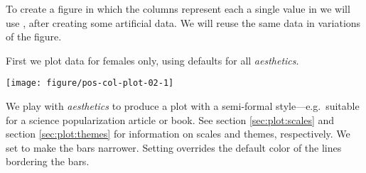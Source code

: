 \documentclass[krantz2]{krantz}\usepackage{knitr}%
\begin{document}
To create a figure in which the columns represent each a single value in  we will use , after creating some artificial data. We will reuse the same data in variations of the figure.

\begin{knitrout}\footnotesize
{}\color{fgcolor}\begin{kframe}
\begin{alltt}
\hlstd{(}\hlstd{)}
 \hlkwb{<-} \hlstd{(} \hlstd{=} \hlstd{(}\hlstd{(}\hlstd{(}\hlstd{,} \hlstd{,} \hlstd{),} \hlstd{)),}
                           \hlstd{=} \hlstd{(}\hlstd{(}\hlstd{(}\hlstd{,} \hlstd{),} \hlstd{(}\hlstd{,} \hlstd{))),}
                           \hlstd{=} \hlstd{(}\hlstd{)} \hlopt{+} \hlstd{(}\hlstd{,} \hlstd{,} \hlstd{))}
\end{alltt}
\end{kframe}
\end{knitrout}

First we plot data for females only, using defaults for all \emph{aesthetics}.

\begin{knitrout}\footnotesize
{}\color{fgcolor}\begin{kframe}
\begin{alltt}
\hlstd{(} \hlopt{==} \hlstd{),}
       \hlstd{(}    \hlopt{+}
   \hlstd{()}
\end{alltt}
\end{kframe}

{\centering \texttt{[image: figure/pos-col-plot-02-1]} 

}



\end{knitrout}

We play with \emph{aesthetics} to produce a plot with a semi-formal style---e.g.\ suitable for a science popularization article or book. See section \ref{sec:plot:scales} and section \ref{sec:plot:themes} for information on scales and themes, respectively. We set  to make the bars narrower. Setting  overrides the default color of the lines bordering the bars.
\end{document}
